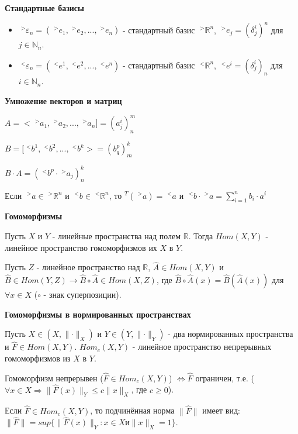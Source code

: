 \documentclass[__main__.tex]{subfiles}
\begin{document}
\textbf{Стандартные базисы}

\begin{itemize}
	\item 
	$\;^{>}\varepsilon_n = (\;^{>}e_1, \;^{>}e_2, ... , \;^{>}e_n)$ - стандартный базис $\;^{>}\mathbb{R}^n$, $\;^{>}e_j = (\delta^i_j)^n$ для $j \in \mathbb{N}_n$.
	
	\item 
	$\;^{<}\varepsilon_n = (\;^{<}e^1, \;^{<}e^2, ... , \;^{<}e^n)$ - стандартный базис $\;^{<}\mathbb{R}^n$, $\;^{<}e^i = (\delta^i_j)_n$ для $i \in \mathbb{N}_n$.
\end{itemize}

\textbf{Умножение векторов и матриц}

$A = < \;^{>}a_1, \;^{>}a_2, ... , \;^{>}a_n ] = (a^i_j)^m_n$

$B = [ \;^{<}b^1, \;^{<}b^2, ... , \;^{<}b^k > = (b^p_q)^k_m$

$B \cdot A = (\;^{<}b^p \cdot \;^{>}a_j)^k_n$

Если $\;^{>}a \in \;^{>}\mathbb{R}^n$ и $\;^{<}b \in \;^{<}\mathbb{R}^n$, то $^{T}(\;^{>}a) = \;^{<}a$ и $\;^{<}b \cdot \;^{>}a = \sum_{i = 1}^{n} b_i \cdot a^i$

\textbf{Гомоморфизмы}

Пусть $X$ и $Y$ - линейные пространства над полем $\mathbb{R}$. Тогда $Hom(X,Y)$ - линейное пространство гомоморфизмов их $X$ в $Y$.

Пусть $Z$ - линейное пространство над $\mathbb{R}$, $\hat{A} \in Hom(X,Y)$ и $\hat{B} \in Hom(Y,Z) \rightarrow \hat{B} \circ \hat{A} \in Hom (X,Z)$, где $\hat{B} \circ \hat{A} (x) = \hat{B}(\hat{A}(x))$ для $\forall x \in X$ ($\circ$ - знак суперпозиции).

\textbf{Гомоморфизмы в нормированных пространствах}

Пусть $X \in (X, \lVert \cdot \rVert_X)$ и $Y \in (Y, \lVert \cdot \rVert_Y)$ - два нормированных пространства и $\hat{F} \in Hom(X,Y)$. $Hom_c(X,Y)$ - линейное пространство непрерывных гомоморфизмов из $X$ в $Y$.

\begin{statement}
	Гомоморфизм непрерывен ($\hat{F} \in Hom_c(X,Y)$) $\Leftrightarrow \hat{F}$ ограничен, т.е. ($\forall x \in X \Rightarrow \lVert \hat{F}(x) \rVert_Y \leqslant c \lVert x \rVert_X$, где $c \geqslant 0$).
\end{statement}

\begin{definition}
	Если $\hat{F} \in Hom_c(X,Y)$, то подчинённая норма $\lVert \hat{F} \rVert$ имеет вид: $\lVert \hat{F} \rVert = sup \lbrace \lVert \hat{F}(x) \rVert_Y : x \in X и \lVert x \rVert_X = 1 \rbrace$.
\end{definition}
\end{document}
